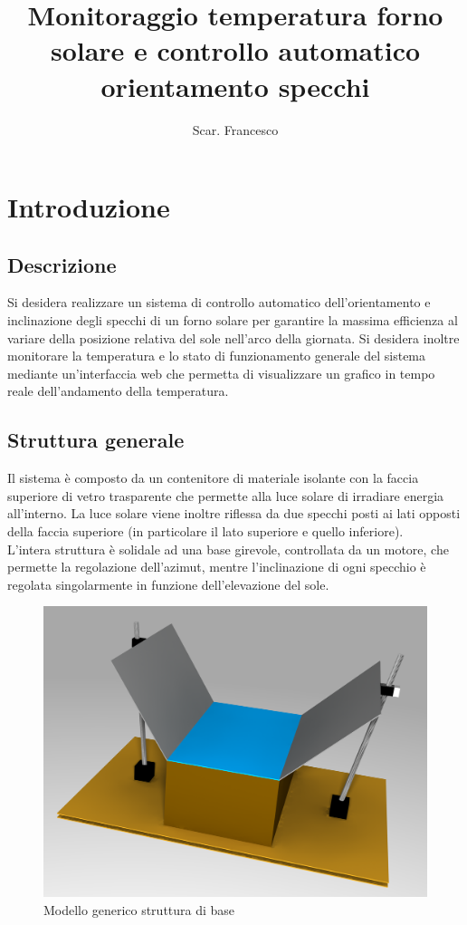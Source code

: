 \documentclass[12pt]{article}
\title{\textbf{Monitoraggio temperatura forno solare e controllo automatico orientamento specchi}}
\author{Scar. Francesco}
\date{}
\begin{document}
\maketitle

\tableofcontents{}

\newpage



\section{Introduzione}
    \subsection{Descrizione}
    Si desidera realizzare un sistema di controllo automatico dell'orientamento e inclinazione degli specchi di un forno solare per garantire la massima efficienza al variare della posizione relativa del sole nell'arco della giornata.
    Si desidera inoltre monitorare la temperatura e lo stato di funzionamento generale del sistema mediante un'interfaccia web che permetta di visualizzare un grafico in tempo reale dell'andamento della temperatura.


    \subsection{Struttura generale}
    Il sistema è composto da un contenitore di materiale isolante con la faccia superiore di vetro trasparente che permette alla luce solare di irradiare energia all'interno. La luce solare viene inoltre riflessa da due specchi posti ai lati opposti della faccia superiore (in particolare il lato superiore e quello inferiore).\\
    L'intera struttura è solidale ad una base girevole, controllata da un motore, che permette la regolazione dell'azimut, mentre l'inclinazione di ogni specchio è regolata singolarmente in funzione dell'elevazione del sole.
    
    \begin{figure}[h]
    \centering
        \includegraphics[width=380pt]{Draws/3D_render_cut.png}
        \caption{Modello generico struttura di base}
    \end{figure}
    
\end{document}
